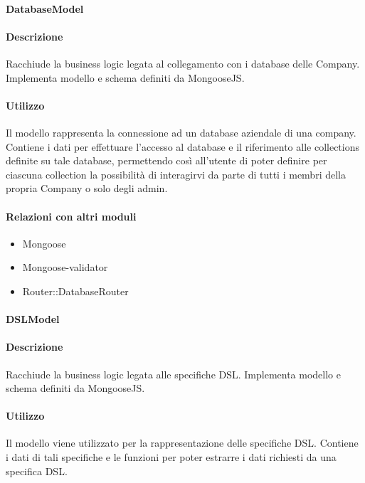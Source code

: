 \paragraph{DatabaseModel}
\paragraph*{Descrizione}

Racchiude la business logic legata al collegamento con i database delle Company. Implementa modello e schema definiti da MongooseJS.

\paragraph*{Utilizzo}
Il modello rappresenta la connessione ad un database aziendale di una company. Contiene i dati per effettuare l'accesso al database e il riferimento alle collections definite su tale database, permettendo così all'utente di poter definire per ciascuna collection la possibilità di interagirvi da parte di tutti i membri della propria Company o solo degli admin.

\paragraph*{Relazioni con altri moduli}
\begin{itemize}
\item Mongoose
\item Mongoose-validator
\item Router::DatabaseRouter
\end{itemize}

\paragraph{DSLModel}
\paragraph*{Descrizione}

Racchiude la business logic legata alle specifiche DSL. Implementa modello e schema definiti da MongooseJS.

\paragraph*{Utilizzo}
Il modello viene utilizzato per la rappresentazione delle specifiche DSL. Contiene i dati di tali specifiche e le funzioni per poter estrarre i dati richiesti da una specifica DSL.

